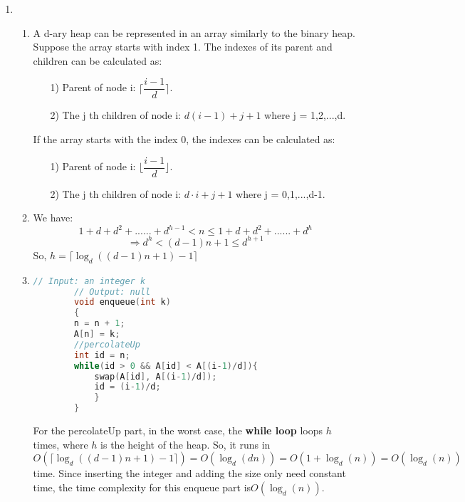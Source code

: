 \documentclass[12pt,a4paper]{article}
\makeatletter
\newtheorem*{solution}{Solution}
\theoremstyle{definition}
\renewenvironment{solution}[1][Solution] {\par\pushQED{\qed}\normalfont\topsep6\p@\@plus6\p@\relax\trivlist\item[\hskip\labelsep\bfseries#1\@addpunct{.}]\ignorespaces}{\popQED\endtrivlist\@endpefalse} \makeatother
\makeatother
\begin{document}
\begin{enumerate}
\begin{solution}
\hspace*{\fill}
	\begin{enumerate}
		\item A d-ary heap can be represented in an array similarly to the binary heap. Suppose the array starts with index 1. The indexes of its parent and children can be calculated as:
		\begin{enumerate}
			\item[1)] Parent of node i: $\lceil \dfrac{i-1}{d}\rceil $.
			\item[2)] The j th children of node i: $d(i-1)+j+1$  where j = 1,2,...,d.
		\end{enumerate}
	 If the array starts with the index 0, the indexes can be calculated as:
	 \begin{enumerate}
	 	\item[1)] Parent of node i: $\lfloor \dfrac{i-1}{d}\rfloor $.
	 	\item[2)] The j th children of node i: $d\cdot i+j+1$  where j = 0,1,...,d-1.
	 \end{enumerate}
		\item We have:
		$$
		1+ d + d^2 + ...... + d^{h-1} < n \leq 1+ d + d^2 + ...... + d^{h} 
		$$
		$$
		\Rightarrow d^h < (d-1)n + 1 \leq d^{h+1}
		$$
		So, $h = \lceil \log_d( (d-1)n + 1 ) - 1 \rceil$ 
		\item 
		\begin{lstlisting}[language=C++]
		// Input: an integer k
		// Output: null
		void enqueue(int k)
		{
		n = n + 1;
		A[n] = k;
		//percolateUp
		int id = n;
		while(id > 0 && A[id] < A[(i-1)/d]){
			swap(A[id], A[(i-1)/d]);
			id = (i-1)/d;
			}
		}
		\end{lstlisting}
	For the percolateUp part, in the worst case, the \textbf{while loop } loops $h$ times, where $h$ is the height of the heap. So, it runs in $O(\lceil \log_d( (d-1)n + 1 ) - 1\rceil )  = O(\log_d(dn))  = O(1 + \log_d(n) ) = O(\log_d (n))$ time. Since inserting the integer and adding the size only need constant time, the time complexity for this enqueue part is$O(\log_d (n))$.

		
	\end{enumerate}
\end{solution}


\end{enumerate}
\end{document}
